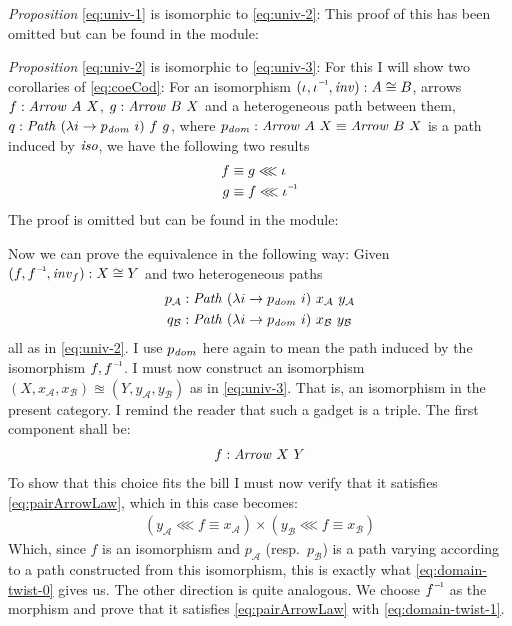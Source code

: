 \emph{Proposition} \ref{eq:univ-1} is isomorphic to \ref{eq:univ-2}:
This proof of this has been omitted but can be found in the module:
%
\begin{center}%
\end{center}
%
\emph{Proposition} \ref{eq:univ-2} is isomorphic to \ref{eq:univ-3}: For this I
will show two corollaries of \ref{eq:coeCod}: For an isomorphism $(\iota,
\inv{\iota}, \var{inv}) \tp A \cong B$, arrows $f \tp \Arrow\ A\ X$, $g \tp
\Arrow\ B\ X$ and a heterogeneous path between them, $q \tp \Path\ (\lambda i
\to p_{\var{dom}}\ i)\ f\ g$, where $p_{\var{dom}} \tp \Arrow\ A\ X \equiv
\Arrow\ B\ X$ is a path induced by $\mathit{iso}$, we have the following two
results
%
\begin{align}
\label{eq:domain-twist-0}
f & \equiv g \lll \iota \\
\label{eq:domain-twist-1}
g & \equiv f \lll \inv{\iota}
\end{align}
%
The proof is omitted but can be found in the module:
\begin{center}
\end{center}

Now we can prove the equivalence in the following way: Given $(f, \inv{f},
\var{inv}_f) \tp X \cong Y$ and two heterogeneous paths
%
\begin{align*}
p_{\mathcal{A}} & \tp \Path\ (\lambda i \to p_{\var{dom}}\ i)\ x_{\mathcal{A}}\ y_{\mathcal{A}}\\
%
q_{\mathcal{B}} & \tp \Path\ (\lambda i \to p_{\var{dom}}\ i)\ x_{\mathcal{B}}\ y_{\mathcal{B}}
\end{align*}
%
all as in \ref{eq:univ-2}. I use $p_{\mathit{dom}}$ here again to mean the path
induced by the isomorphism $f, \inv{f}$. I must now construct an isomorphism
$(X, x_{\mathcal{A}}, x_{\mathcal{B}}) \approxeq (Y, y_{\mathcal{A}}, y_{\mathcal{B}})$
as in \ref{eq:univ-3}. That is, an isomorphism in the present category. I remind
the reader that such a gadget is a triple. The first component shall be:
%
\begin{align}
f \tp \Arrow\ X\ Y
\end{align}
%
To show that this choice fits the bill I must now verify that it satisfies
\ref{eq:pairArrowLaw}, which in this case becomes:
%
\begin{align}
(y_{\mathcal{A}} \lll f ≡ x_{\mathcal{A}}) × (y_{\mathcal{B}} \lll f ≡ x_{\mathcal{B}})
\end{align}
%
Which, since $f$ is an isomorphism and $p_{\mathcal{A}}$ (resp.\ $p_{\mathcal{B}}$)
is a path varying according to a path constructed from this isomorphism, this is
exactly what \ref{eq:domain-twist-0} gives us.
%
The other direction is quite analogous. We choose $\inv{f}$ as the morphism and
prove that it satisfies \ref{eq:pairArrowLaw} with \ref{eq:domain-twist-1}.

